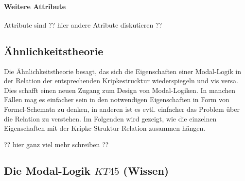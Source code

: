 \paragraph{Weitere Attribute} %
\label{par:weitere_attribute} Attribute sind ?? hier andere Atribute diskutieren ??


\subsection{Ähnlichkeitstheorie} %
\label{sub:Aehnlichkeitstheorie}
Die Ähnlichkeitstheorie besagt, das sich die Eigenschaften einer Modal-Logik in der Relation der entsprechenden Kripkestrucktur wiederspiegeln und vis versa. Dies schafft einen neuen Zugang zum Design von Modal-Logiken. In manchen Fällen mag es einfacher sein in den notwendigen Eigenschaften in Form von Formel-Schemata zu denken, in anderen ist es evtl. einfacher das Problem über die Relation zu verstehen. 
Im Folgenden wird gezeigt, wie die einzelnen Eigenschaften mit der Kripke-Struktur-Relation zusammen hängen.

?? hier ganz viel mehr schreiben ??



\subsection{Die Modal-Logik $KT45$ (Wissen)} %
\label{sub:the_normal_modal_logic_s5_}


